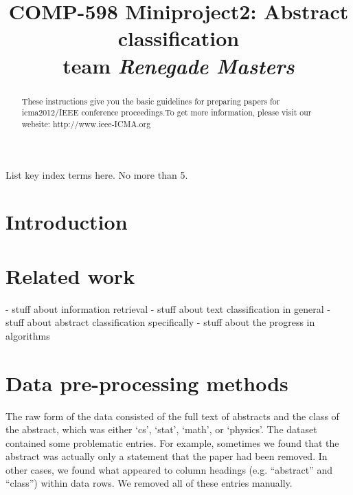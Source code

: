 \documentclass[conference,letterpaper]{IEEEtran}
\title{}
\begin{document}
\title{\huge 
	COMP-598 Miniproject2: Abstract classification\\
	team \textit{Renegade Masters}
}

\author{
%
}
\maketitle
\begin{abstract}
These instructions give you the basic guidelines for preparing
papers for icma2012/IEEE conference proceedings.To get more information,
please visit our website: http://www.ieee-ICMA.org
\\
\end{abstract}

\begin{keywords}
List key index terms here. No more than 5.
\end{keywords}

\section{Introduction}
\section{Related work}
- stuff about information retrieval
- stuff about text classification in general
- stuff about abstract classification specifically
- stuff about the progress in algorithms

\section{Data pre-processing methods}
The raw form of the data consisted of the full text of abstracts and the
class of the abstract, which was either `cs', `stat', `math', or `physics'.
The dataset contained some problematic entries.  For example, sometimes we
found that the abstract was actually only a statement that the paper had been
removed.  In other cases, we found what appeared to column headings (e.g.
``abstract'' and ``class'') within data rows.  We removed all of these entries
manually.
\end{document}
